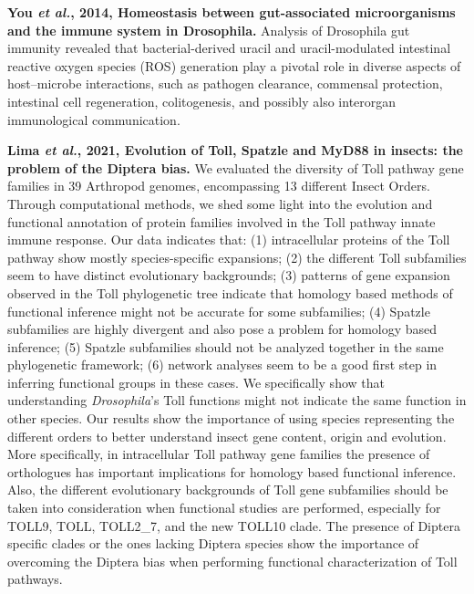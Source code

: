 \documentclass[11pt]{article}
\begin{document}
\begin{sloppypar}
\par
\textbf{You \textit{et al.}, 2014, Homeostasis between gut-associated microorganisms and the immune system in Drosophila.} \newline
Analysis of Drosophila gut immunity revealed that bacterial-derived uracil and uracil-modulated intestinal reactive oxygen species (ROS) generation play a pivotal role in diverse aspects of host–microbe interactions, such as pathogen clearance, commensal protection, intestinal cell regeneration, colitogenesis, and possibly also interorgan immunological communication. 
\par
\textbf{Lima \textit{et al.}, 2021, Evolution of Toll, Spatzle and MyD88 in insects: the problem of the Diptera bias.} \newline
We evaluated the diversity of Toll pathway gene families in 39 Arthropod genomes, encompassing 13 different Insect Orders. 
Through computational methods, we shed some light into the evolution and functional annotation of protein families involved in the Toll pathway innate immune response. 
Our data indicates that: 
(1) intracellular proteins of the Toll pathway show mostly species-specific expansions; 
(2) the different Toll subfamilies seem to have distinct evolutionary backgrounds; 
(3) patterns of gene expansion observed in the Toll phylogenetic tree indicate that homology based methods of functional inference might not be accurate for some subfamilies; 
(4) Spatzle subfamilies are highly divergent and also pose a problem for homology based inference; (5) Spatzle subfamilies should not be analyzed together in the same phylogenetic framework; 
(6) network analyses seem to be a good first step in inferring functional groups in these cases. 
We specifically show that understanding \textit{Drosophila}’s Toll functions might not indicate the same function in other species. 
Our results show the importance of using species representing the different orders to better understand insect gene content, origin and evolution. 
More specifically, in intracellular Toll pathway gene families the presence of orthologues has important implications for homology based functional inference. 
Also, the different evolutionary backgrounds of Toll gene subfamilies should be taken into consideration when functional studies are performed, especially for TOLL9, TOLL, TOLL2_7, and the new TOLL10 clade. 
The presence of Diptera specific clades or the ones lacking Diptera species show the importance of overcoming the Diptera bias when performing functional characterization of Toll pathways.
\par

\end{sloppypar}
\end{document}
